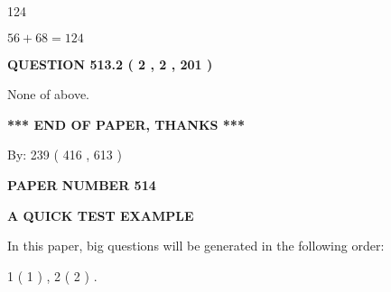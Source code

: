 \documentclass[12pt]{article}
\begin{document}
124
 
 
 
 
\noindent{}

$ %
56 +  %
68=   %
124$
 
 
  
\vspace{0.2in}
  
{\textbf{\Large{QUESTION
513.2 
 ( 2 , 2 , 201 )
}}}
  
  
 
 
\noindent{}
 
 
 None of above.
 
 
 
 
   
   
 \vspace{0.2in}
 
   
   
   
   
\vspace{1.0in} 
{\textbf{\large{ *** END OF PAPER, THANKS *** }}} 
   
   
\hspace{1.0in} By: 
 239 ( 416 ,  613 )
   
   
   
   
\newpage 
\setcounter{page}{ 
   514001 } 
   
   
   
   
 {\textbf{ \Large{ PAPER NUMBER  514  }}}
   
   
\vspace{0.2in}
   
   
   
   
   
   
 \vspace{0.2in}
{\LARGE {\textbf{ A QUICK TEST EXAMPLE}}}
   
   
   
\vspace{0.2in}
   
In this paper, big questions will be generated in the following order: 
   
   
   1 ( 1 )
 ,
   2 ( 2 )
 .
  
\vspace{0.2in}
  
\end{document}
